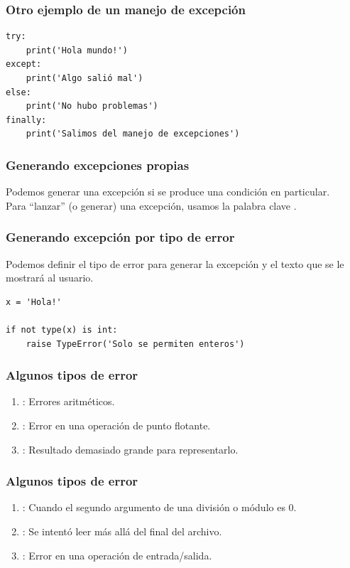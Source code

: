 \documentclass[12pt]{beamer}
\begin{document}
\begin{frame}[fragile]
\frametitle{Otro ejemplo de un manejo de excepción}
\begin{lstlisting}[caption=Manejo con un else]
try:
    print('Hola mundo!')
except:
    print('Algo salió mal')
else:
    print('No hubo problemas')
finally:
    print('Salimos del manejo de excepciones')
\end{lstlisting}
\end{frame}
\begin{frame}
\frametitle{Generando excepciones propias}
Podemos generar una excepción si se produce una condición en particular.
\\
\bigskip
\pause
Para \enquote{lanzar} (o generar) una excepción, usamos la palabra clave .
\end{frame}
\begin{frame}[fragile]
\frametitle{Generando excepción por tipo de error}
Podemos definir el tipo de error para generar la excepción y el texto que se le mostrará al usuario.
\begin{lstlisting}[caption=Generando una excepción]
x = 'Hola!'

if not type(x) is int:
    raise TypeError('Solo se permiten enteros')
\end{lstlisting}    
\end{frame}
\begin{frame}
\frametitle{Algunos tipos de error}
\begin{enumerate}[<+->]
\item {}: Errores aritméticos.
\item {}: Error en una operación de punto flotante.
\item {}: Resultado demasiado grande para representarlo.
\seti
\end{enumerate}
\end{frame}
\begin{frame}
\frametitle{Algunos tipos de error}
\begin{enumerate}[<+->]
\conti    
\item {}: Cuando el segundo argumento de una división o módulo es $0$.
\item {}: Se intentó leer más allá del final del archivo.
\item {}: Error en una operación de entrada/salida.
\end{enumerate}
\end{frame}
\end{document}
